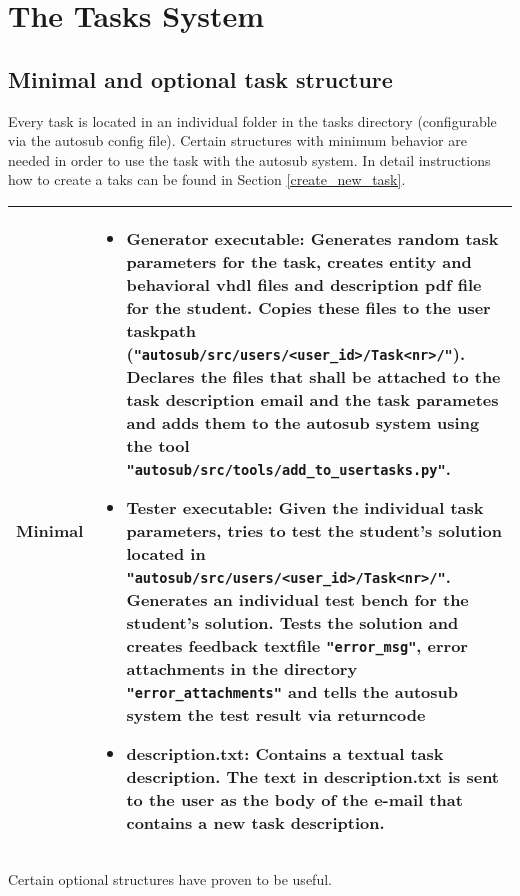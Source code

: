 \section{The Tasks System} \label{tasks_system}

\subsection{Minimal and optional task structure}

Every task is located in an individual folder in the tasks directory (configurable via 
the autosub config file). Certain structures with minimum behavior are needed in order 
to use the task with the autosub system. In detail instructions how to create a taks can 
be found in Section \ref{create_new_task}.

\begin{tabular}{|p{3cm}|p{10cm}|}
\hline

Minimal & \begin{itemize}
    \item {\bf Generator executable:} Generates random task parameters for the task, 
		creates entity and behavioral vhdl files and description pdf file for the student. Copies
		these files to the user taskpath ({\tt "autosub/src/users/<user\_id>/Task<nr>/"}). Declares
		the files that shall be attached to the task description email and the task parametes and 
		adds them to the autosub system using the tool {\tt "autosub/src/tools/add\_to\_usertasks.py"}.
    \item {\bf Tester executable:} Given the individual task parameters, tries to test
		the student's solution located in {\tt "autosub/src/users/<user\_id>/Task<nr>/"}. 
		Generates an individual test bench for the student's solution. Tests 
        the solution and creates feedback textfile {\tt "error\_msg"}, error attachments in the directory
		{\tt "error\_attachments"} and tells the autosub system the test result via returncode
    \item {\bf description.txt:} Contains a textual task description. The text in description.txt 
    	is sent to the user as the body of the e-mail that contains a new task description.
	\end{itemize} 
\\
\hline
\end{tabular}

\newpage

Certain optional structures have proven to be useful.

